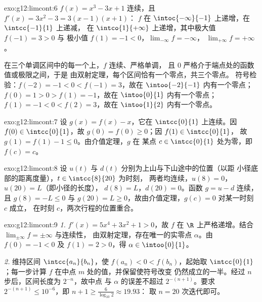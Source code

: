 \begin{solution}{exo:g12:limcont:6}
$f(x) = x^3 - 3x + 1$ 连续，且 $f'(x) = 3x^2 - 3 = 3(x-1)(x+1)$：
$f$ 在 $\intoc{-\infty}{-1}$ 上递增，在 $\intcc{-1}{1}$ 上递减，
在 $\intco{1}{+\infty}$ 上递增，其中极大值 $f(-1) = 3 > 0$ 与
极小值 $f(1) = -1 < 0$，$\lim_{-\infty} f = -\infty$，
$\lim_{+\infty} f = +\infty$。

在三个单调区间中的每一个上，$f$ 连续、严格单调，
且 $0$ 严格介于端点处的函数值或极限之间，于是
由双射定理，每个区间恰有一个零点，共三个零点。
符号检验：$f(-2) = -1 < 0 < f(-1) = 3$，故在
$\intoo{-2}{-1}$ 内有一个零点；$f(0) = 1 > 0 > f(1) = -1$，故在 $\intoo{0}{1}$ 内有一个零点；
$f(1) = -1 < 0 < f(2) = 3$，故在 $\intoo{1}{2}$ 内有一个零点。
\end{solution}

\begin{solution}{exo:g12:limcont:7}
设 $g(x) = f(x) - x$，它在 $\intcc{0}{1}$ 上连续。因
$f(0) \in \intcc{0}{1}$，故 $g(0) = f(0) \geq 0$；因 $f(1) \in \intcc{0}{1}$，
故 $g(1) = f(1) - 1 \leq 0$。由介值定理，$g$ 在
某点 $c \in \intcc{0}{1}$ 处为零，即 $f(c) = c$。
\end{solution}

\begin{solution}{exo:g12:limcont:8}
设 $u(t)$ 与 $d(t)$ 分别为上山与下山途中的位置（以距
小径底部的距离度量），$t \in \intcc{8}{20}$ 为时刻，
两者均连续，$u(8) = 0$，$u(20) = L$（即小径的长度），
$d(8) = L$，$d(20) = 0$。函数 $g = u - d$ 连续，且
$g(8) = -L \leq 0$ 与 $g(20) = L \geq 0$，故由介值定理，$g(c) = 0$ 对某一时刻 $c$ 成立，
在时刻 $c$，两次行程的位置重合。
\end{solution}

\begin{solution}{exo:g12:limcont:9}
\emph{1.} $f'(x) = 5x^4 + 3x^2 + 1 > 0$，故 $f$ 在
$\R$ 上严格递增。结合 $\lim_{\pm\infty} f = \pm\infty$ 与连续性，
由双射定理，存在唯一的实零点 $\alpha$。由 $f(0) = -1 < 0$ 及
$f(1) = 2 > 0$，得 $\alpha \in \intoo{0}{1}$。

\emph{2.} 维持区间 $\intcc{a_n}{b_n}$，使
$f(a_n) < 0 < f(b_n)$，起始取 $\intcc{0}{1}$；每一步计算
$f$ 在中点 $m$ 处的值，并保留使符号改变
仍然成立的一半。经过 $n$ 步后，区间长度为 $2^{-n}$，故中点
与 $\alpha$ 的误差不超过 $2^{-(n+1)}$。要求
$2^{-(n+1)} \leq 10^{-6}$，即 $n + 1 \geq \frac{6}{\log_{10} 2} \approx 19.93$：
取 $n = 20$ 次迭代即可。
\end{solution}

